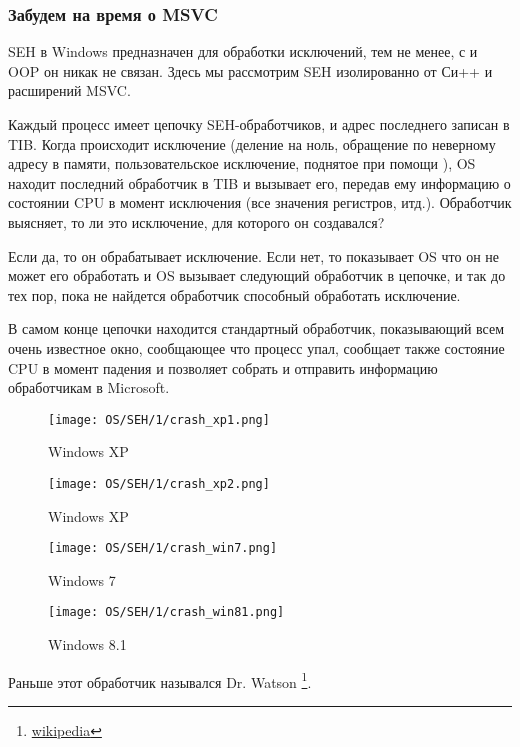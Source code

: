 \subsubsection{Забудем на время о MSVC}

\ac{SEH} в Windows предназначен для обработки исключений, тем не менее, с \Cpp и \ac{OOP} он никак не связан.
Здесь мы рассмотрим \ac{SEH} изолированно от Си++ и расширений MSVC.

Каждый процесс имеет цепочку \ac{SEH}-обработчиков, и адрес последнего записан в \ac{TIB}.
Когда происходит исключение (деление на ноль, обращение по неверному адресу в памяти, 
пользовательское исключение, поднятое при помощи ),
\ac{OS} находит последний обработчик в \ac{TIB} и вызывает его, 
передав ему информацию о состоянии \ac{CPU} в момент исключения
(все значения регистров, итд.).
Обработчик выясняет, то ли это исключение, для которого он создавался?

Если да, то он обрабатывает исключение.
Если нет, то показывает \ac{OS} что он не может его обработать и \ac{OS} вызывает следующий обработчик
в цепочке, и так до тех пор, пока не найдется обработчик способный обработать исключение.

В самом конце цепочки находится стандартный обработчик, показывающий всем очень известное окно, 
сообщающее что процесс упал, 
сообщает также состояние \ac{CPU} в момент падения и позволяет собрать и отправить информацию обработчикам 
в Microsoft. 

\begin{figure}[H]
\centering
\texttt{[image: OS/SEH/1/crash\_xp1.png]}
\caption{Windows XP}
\end{figure}

\begin{figure}[H]
\centering
\texttt{[image: OS/SEH/1/crash\_xp2.png]}
\caption{Windows XP}
\end{figure}

\begin{figure}[H]
\centering
\texttt{[image: OS/SEH/1/crash\_win7.png]}
\caption{Windows 7}
\end{figure}

\begin{figure}[H]
\centering
\texttt{[image: OS/SEH/1/crash\_win81.png]}
\caption{Windows 8.1}
\end{figure}

Раньше этот обработчик назывался Dr. Watson
\footnote{\href{http://go.yurichev.com/17046}{wikipedia}}.

